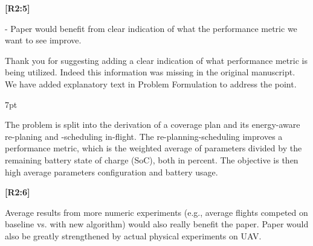 \documentclass[10pt]{letter}
\newenvironment{formal}{%
  \def\FrameCommand{%
    \hspace{1pt}%
    {\color{red}\vrule width 2pt}%
    {\color{formalshade}\vrule width 4pt}%
    \colorbox{formalshade}%
  }%
  \MakeFramed{\advance\hsize-\width\FrameRestore}%
  \noindent\hspace{-4.55pt}%
  \begin{adjustwidth}{}{7pt}%
  \vspace{2pt}\vspace{2pt}%
}
{%
  \vspace{2pt}\end{adjustwidth}\endMakeFramed%
}
\begin{document}
{\hspace*{-4.5em}\textbf{[R2:5]}\vspace*{-1.9em}}

- Paper would benefit from clear indication of what the performance metric we want to see improve. 
  
{\color{blue} 
  
{\hspace*{-4.5em}{[R2:5]}\vspace*{-1.9em}}
  
Thank you for suggesting adding a clear indication of what performance metric is being utilized. Indeed this information was missing in the original manuscript. We have added explanatory text in Problem Formulation to address the point.

\begin{formal}\color{black}

  The problem %
  is {\color{blue}split into }%
  {\color{blue}the derivation }%
  {\color{blue} of} a {\color{blue}coverage} plan %
  {\color{blue}and its} {\color{blue}energy-aware} %
  re-plan{\color{blue}ing} and -schedul{\color{blue}ing } %
  in-flight. %
  {\color{blue} 
  The re-planning-scheduling improves a performance metric, which is %
  the weighted average of parameters divided by the remaining battery state of charge (SoC), both in percent. The objective is then high average parameters configuration and battery usage.
  }
\vspace*{1ex}
\end{formal}
}

  {\hspace*{-4.5em}\textbf{[R2:6]}\vspace*{-1.9em}}

  Average results from more numeric experiments (e.g., average flights competed on baseline vs. with new algorithm) would also really benefit the paper. Paper would also be greatly strengthened by actual physical experiments on UAV.
  
\end{document}
